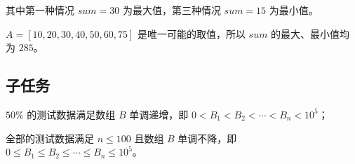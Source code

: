 其中第一种情况 $sum = 30$ 为最大值，第三种情况 $sum = 15$ 为最小值。

\examplebox*{}{}

$A = [10, 20, 30, 40, 50, 60, 75]$ 是唯一可能的取值，所以 $sum$ 的最大、最小值均为 $285$。

\subsection*{子任务}

$50\%$ 的测试数据满足数组 $B$ 单调递增，即 $0 < B_1 < B_2 < \cdots < B_n < 10^{5}$；

全部的测试数据满足 $n \le 100$ 且数组 $B$ 单调不降，即 $0 \le B_1 \le B_2 \le \cdots \le B_n \le 10^{5}$。


